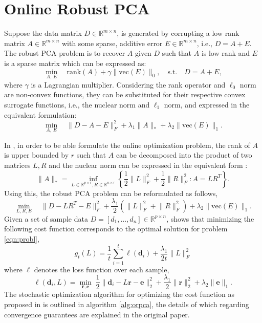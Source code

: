 \documentclass[a4paper,11pt]{article}
\newcommand{\fro}[1]{\lVert #1 \rVert_F^2}
\newcommand{\nuc}[1]{\lVert #1 \rVert_*}
\newcommand{\norm}[2]{\lVert #1 \rVert_{#2}}
\newcommand{\half}{\frac{1}{2}}
\newcommand{\real}{\mathbb{R}}
\newcommand{\di}{\mathbf{d}_i}
\newcommand{\br}{\mathbf{r}}
\newcommand{\be}{\mathbf{e}}
\begin{document}
\section{Online Robust PCA}
Suppose the data matrix $D \in \mathbb{R}^{m \times n}$, is generated by
corrupting a low rank matrix $A \in \mathbb{R}^{m \times n}$ with some sparse,
additive error $E \in \mathbb{R}^{m \times n}$, i.e., $D = A + E$. The robust
PCA problem \cite{NIPS2009} is to recover $A$ given $D$ such that
$A$ is low rank and $E$ is a sparse matrix which can be expressed as:
\begin{equation}
  \min_{A,\,E} \quad  \text{rank}(A) + \gamma \lVert
  \text{vec}(E)\rVert_0, \quad \textrm{s.t.} \quad D = A + E,
\end{equation}
where $\gamma$ is a Lagrangian multiplier. Considering the rank operator
and $\ell_0$  norm are non-convex functions, they can be substituted for their
respective convex surrogate functions, i.e., the nuclear norm and $\ell_1$ norm,
and expressed in the equivalent formulation:
\begin{equation}
  \min_{A,\,E} \quad \fro{D-A-E} + \lambda_1\nuc{A} + \lambda_2 \norm{\text{vec}(E)}{1}. 
\end{equation}

In \cite{FengORPCA}, in order to be able formulate the online optimization
problem, the rank of $A$ is upper bounded by $r$ such that $A$ can be
decomposed into the product of two matrices $L, R$ and the nuclear norm can be
expressed in the equivalent form \cite{Recht_2010}:
\begin{equation}
  \nuc{A} = \inf_{L \in \real^{p \times r}, R \in \real^{n \times r}}
  \left\{ \half \fro{L} + \half \fro{R} : A = LR^T\right\}.
\end{equation}
Using this, the robust PCA problem can be reformulated as follows,
\begin{equation}
  \min_{L,R,E} \quad \fro{D-LR^T-E} + \frac{\lambda_1}{2}\left(\fro{L} + \fro{R}\right) 
  + \lambda_2 \norm{\text{vec}(E)}{1}. 
  \label{eqn:probl}
\end{equation}
Given a set of sample data $D = [d_1, \dots, d_n] \in \real^{p \times n}$,
\cite{FengORPCA} shows that minimizing the following cost function corresponds to the
optimal solution for problem \ref{eqn:probl},
\begin{equation}
  \label{eqn:cost}
  g_t (L) = \frac{1}{t} \sum_{i=1}^{t} \ell(\di) + \frac{\lambda_1}{2t} \fro{L}
\end{equation}
where $\ell$ denotes the loss function over each sample,
\begin{equation}
  \ell (\di, L) = \min_{\br, \be} \; \half \norm{\di - L\br - \be}{2}^2
   + \frac{\lambda_1}{2} \norm{\br}{2}^2 + \lambda_2 \norm{\be}{1}.
\end{equation}
The stochastic optimization algorithm for optimizing the cost function as
proposed in \cite{FengORPCA} is outlined in algorithm \ref{alg:orpca}, the
details of which regarding convergence guarantees are explained in the original
paper.
\end{document}
